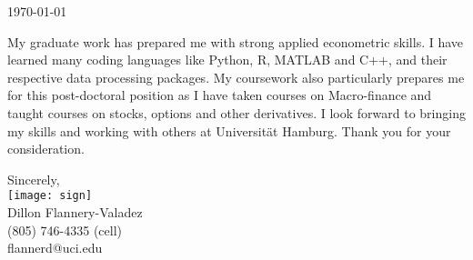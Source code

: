 \documentclass[uci,ee,10pt]{ucletterhead}
\begin{document}
\begin{letter}{

		\today
	}
My graduate work has prepared me with strong applied econometric skills. I have learned many coding languages like Python, R, MATLAB and C++, and their respective data processing packages. My coursework also particularly prepares me for this post-doctoral position as I have taken courses on Macro-finance and taught courses on stocks, options and other derivatives. I look forward to bringing my skills and working with others at Universit\"{a}t Hamburg.  Thank you for your consideration. 
		
		\vspace{1cm}
	
		Sincerely,\\
		\texttt{[image: sign]}\\
		Dillon Flannery-Valadez\\
		(805) 746-4335 (cell)\\
		flannerd@uci.edu\\
\end{letter}
\end{document}

